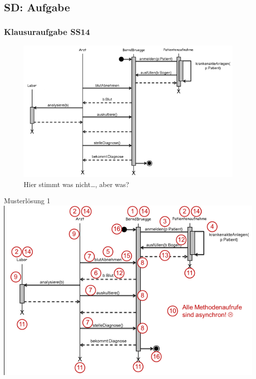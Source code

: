 \documentclass[18pt]{beamer}
\begin{document}
	\subsection{SD: Aufgabe}
	\begin{frame}
		\frametitle{Klausuraufgabe SS14}
			\begin{figure}
				\centering
				\includegraphics[scale=0.65]{./pics/tut2/sdtask.png}
				\caption{Hier stimmt was nicht\dots, aber was?}
			\end{figure}
	\end{frame}

\begin{frame}{Musterlösung 1}
	\includegraphics[scale=0.65]{pics/tut2/solution-seq.png}
\end{frame}
\end{document}
